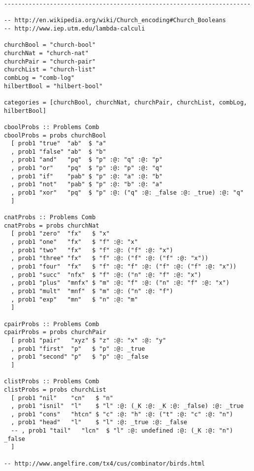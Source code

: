 \documentclass{article}
\begin{document}
\begin{lstlisting}
----------------------------------------------------------------------

-- http://en.wikipedia.org/wiki/Church_encoding#Church_Booleans
-- http://www.iep.utm.edu/lambda-calculi

churchBool = "church-bool"
churchNat = "church-nat"
churchPair = "church-pair"
churchList = "church-list"
combLog = "comb-log"
hilbertBool = "hilbert-bool"

categories = [churchBool, churchNat, churchPair, churchList, combLog, hilbertBool]

cboolProbs :: Problems Comb
cboolProbs = probs churchBool
  [ prob1 "true"  "ab"  $ "a"
  , prob1 "false" "ab"  $ "b"
  , prob1 "and"   "pq"  $ "p" :@: "q" :@: "p"
  , prob1 "or"    "pq"  $ "p" :@: "p" :@: "q"
  , prob1 "if"    "pab" $ "p" :@: "a" :@: "b"
  , prob1 "not"   "pab" $ "p" :@: "b" :@: "a"
  , prob1 "xor"   "pq"  $ "p" :@: ("q" :@: _false :@: _true) :@: "q"
  ]

cnatProbs :: Problems Comb
cnatProbs = probs churchNat
  [ prob1 "zero"  "fx"   $ "x"
  , prob1 "one"   "fx"   $ "f" :@: "x"
  , prob1 "two"   "fx"   $ "f" :@: ("f" :@: "x")
  , prob1 "three" "fx"   $ "f" :@: ("f" :@: ("f" :@: "x"))
  , prob1 "four"  "fx"   $ "f" :@: "f" :@: ("f" :@: ("f" :@: "x"))
  , prob1 "succ"  "nfx"  $ "f" :@: ("n" :@: "f" :@: "x")
  , prob1 "plus"  "mnfx" $ "m" :@: "f" :@: ("n" :@: "f" :@: "x")
  , prob1 "mult"  "mnf"  $ "m" :@: ("n" :@: "f")
  , prob1 "exp"   "mn"   $ "n" :@: "m"
  ]

cpairProbs :: Problems Comb
cpairProbs = probs churchPair
  [ prob1 "pair"   "xyz" $ "z" :@: "x" :@: "y"
  , prob1 "first"  "p"   $ "p" :@: _true
  , prob1 "second" "p"   $ "p" :@: _false
  ]

clistProbs :: Problems Comb
clistProbs = probs churchList
  [ prob1 "nil"    "cn"   $ "n"
  , prob1 "isnil"  "l"    $ "l" :@: (_K :@: _K :@: _false) :@: _true
  , prob1 "cons"   "htcn" $ "c" :@: "h" :@: ("t" :@: "c" :@: "n")
  , prob1 "head"   "l"    $ "l" :@: _true :@: _false
  -- , prob1 "tail"   "lcn"  $ "l" :@: undefined :@: (_K :@: "n") _false
  ]

-- http://www.angelfire.com/tx4/cus/combinator/birds.html


\end{lstlisting}
\end{document}
